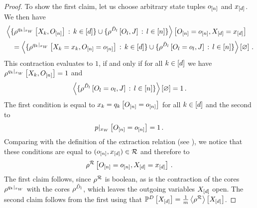 \begin{proof}
    To show the first claim, let us choose arbitrary state tuples $o_{[n]}$ and $x_{[d]}$.
    We then have
    \begin{align*}
        &\left\langle 
            \{\rho^{{q_{k}}|_{x_{W}}}\left[X_{k},O_{[n]}\right] \, : \, k\in[d]\}
            \cup \{\rho^{\tilde{D}_{l}}\left[O_{l},J\right] \, : \, l\in[n]\}
        \right\rangle \left[ O_{[n]}=o_{[n]},X_{[d]}=x_{[d]} \right] \\
        & \quad  =  \left\langle 
            \{\rho^{{q_{k}}|_{x_{W}}}\left[X_{k}=x_{k},O_{[n]}=o_{[n]}\right] \, : \, k\in[d]\}
            \cup \{\rho^{\tilde{D}_{l}}\left[O_{l}=o_{l},J\right] \, : \, l\in[n]\}
        \right\rangle \left[ \varnothing \right] \, .
    \end{align*}
    This contraction evaluates to $1$, if and only if for all $k\in[d]$ we have $\rho^{{q_{k}}|_{x_{W}}}\left[X_{k},O_{[n]}\right]=1$ and
    \begin{align*}
        \left\langle \{\rho^{\tilde{D}_{l}}\left[O_{l}=o_{l},J\right] \, : \, l\in[n]\}\right\rangle \left[ \varnothing \right]  = 1 \, .
    \end{align*}
    The first condition is equal to $x_{k} = q_{k}\left[O_{[n]}=o_{[n]}\right]$ for all $k\in[d]$ and the second to
    \begin{align*}
        {p}|_{x_{W}} \left[O_{[n]}=o_{[n]}\right] = 1 \, .
    \end{align*}
    Comparing with the definition of the extraction relation (see ), we notice that these conditions are equal to $(o_{[n]},x_{[d]})\in\mathcal{R}$ and therefore to
    \begin{align*}
        \rho^{\mathcal{R}}\left[O_{[n]}=o_{[n]},X_{[d]}=x_{[d]}\right] \, .
    \end{align*}
    The first claim follows, since $\rho^{\mathcal{R}}$ is boolean, as is the contraction of the cores $\rho^{{q_{k}}|_{x_{W}}}$ with the cores $\rho^{\tilde{D}_{l}}$, which leaves the outgoing variables $X_{[d]}$ open.
    The second claim follows from the first using that $\mathbb{P}^{D}\left[X_{[d]}\right]=\frac{1}{m}\left\langle \rho^{\mathcal{R}}\right\rangle \left[ X_{[d]} \right]$.
\end{proof}

